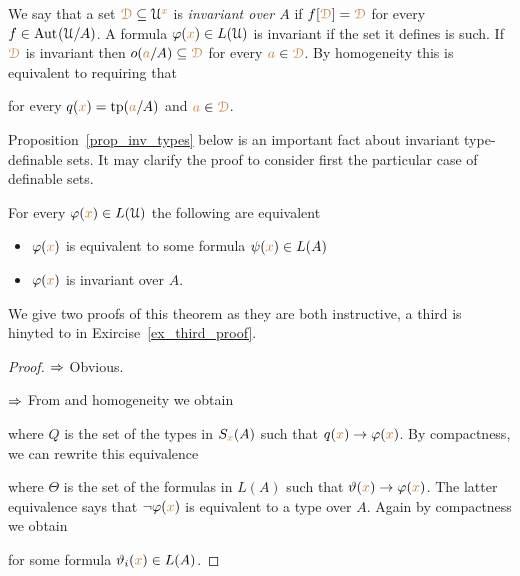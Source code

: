 We say that a set ${\color{brown}\EuScript D}\subseteq\EuScript U^{{\color{brown} x}}$ is \emph{invariant over $A$\/} if $f[{\color{brown}\EuScript D}]={\color{brown}\EuScript D}$ for every $f\in{\rm Aut\kern.15ex}(\EuScript U/A)$.
A formula $\varphi({\color{brown} x})\in L(\EuScript U)$ is invariant if the set it defines is such.   
If ${\color{brown}\EuScript D}$ is invariant then $o({\color{brown} a}/A)\subseteq {\color{brown}\EuScript D}$ for every ${\color{brown} a}\in {\color{brown}\EuScript D}$.
By homogeneity this is equivalent to requiring that 


for every $q({\color{brown} x})={\rm tp}({\color{brown} a}/A)$ and ${\color{brown} a}\in {\color{brown}\EuScript D}$.

Proposition~\ref{prop_inv_types} below is an important fact about invariant type-definable sets.
It may clarify the proof to consider first the particular case of definable sets.

\begin{proposition}\label{prop_inv_def}
For every $\varphi({\color{brown} x})\in L(\EuScript U)$ the following are equivalent
\begin{itemize}
 \item[1.] $\varphi({\color{brown} x})$ is equivalent to some formula $\psi({\color{brown} x})\in L(A)$
 \item[2.] $\varphi({\color{brown} x})$ is invariant over $A$.
\end{itemize}
\end{proposition}

We give two proofs of this theorem as they are both instructive, a third is hinyted to in Exircise~\ref{ex_third_proof}.

\vspace*{-\parskip}
\begin{proof}
$\Rightarrow$ Obvious.

$\Rightarrow$ From  and homogeneity we obtain


where $Q$ is the set of the types in $S_{\color{brown} x}(A)$ such that $q({\color{brown} x})\rightarrow\varphi({\color{brown} x})$. 
By compactness, we can rewrite this equivalence 


where $\Theta$ is the set of the formulas in $L(A)$ such that $\vartheta({\color{brown} x})\rightarrow\varphi({\color{brown} x})$.
The latter equivalence says that $\neg\varphi({\color{brown} x})$ is equivalent to a type over $A$. 
Again by compactness we obtain 


for some formula $\vartheta_i({\color{brown} x})\in L(A)$.
\end{proof}

